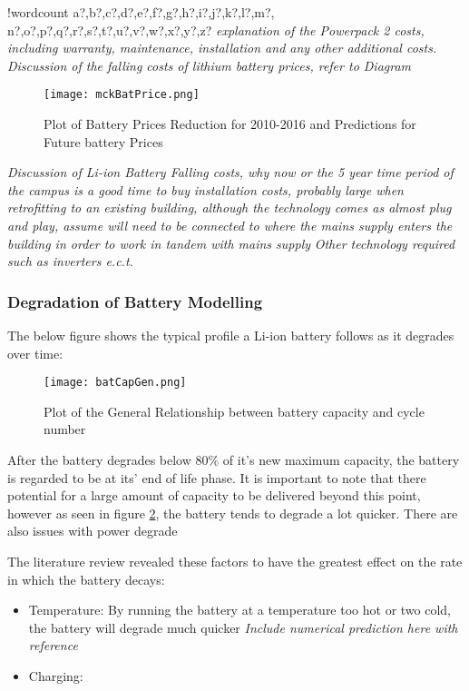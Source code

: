 \documentclass[fontsize=9.5pt]{extarticle}
\providecommand{\tightlist}{%
  \setlength{\itemsep}{0pt}\setlength{\parskip}{0pt}}
\newcounter{words}
\newenvironment{counted}{%
  \setcounter{words}{0}
  \SearchList!{wordcount}{\stepcounter{words}}
    {a?,b?,c?,d?,e?,f?,g?,h?,i?,j?,k?,l?,m?,
    n?,o?,p?,q?,r?,s?,t?,u?,v?,w?,x?,y?,z?}
  \UndoBoundary{'}
  \SearchOrder{p;}}{%
  \StopSearching}
\begin{document}
\begin{counted}
\emph{explanation of the Powerpack 2 costs, including warranty,
maintenance, installation and any other additional costs. Discussion of
the falling costs of lithium battery prices, refer to Diagram}

\begin{figure}[H]
  \centering
  \texttt{[image: mckBatPrice.png]}
  \caption{Plot of Battery Prices Reduction for 2010-2016 and Predictions for Future battery Prices \cite{mckBat}}
  \label{mckBatPrice}
\end{figure}

\emph{Discussion of Li-ion Battery Falling costs, why now or the 5 year
time period of the campus is a good time to buy} \emph{installation
costs, probably large when retrofitting to an existing building,
although the technology comes as almost plug and play, assume will need
to be connected to where the mains supply enters the building in order
to work in tandem with mains supply} \emph{Other technology required
such as inverters e.c.t.}

\subsubsection{Degradation of Battery
Modelling}\label{degradation-of-battery-modelling}

The below figure shows the typical profile a Li-ion battery follows as
it degrades over time:

\begin{figure}[H]
  \centering
  \texttt{[image: batCapGen.png]}
  \caption{Plot of the General Relationship between battery capacity and cycle number \cite{spotnitz2003simulation} }
  \label{batCapGen}
\end{figure}

After the battery degrades below 80\% of it's new maximum capacity, the
battery is regarded to be at its' end of life phase. It is important to
note that there potential for a large amount of capacity to be delivered
beyond this point, however as seen in figure \ref{batCapGen}, the
battery tends to degrade a lot quicker. There are also issues with power
degrade

The literature review revealed these factors to have the greatest effect
on the rate in which the battery decays:

\begin{itemize}
\tightlist
\item
  Temperature: By running the battery at a temperature too hot or two
  cold, the battery will degrade much quicker \emph{Include numerical
  prediction here with reference \cite{rong2006analytical}}
\item
  Charging:


\end{itemize}
\end{counted}
\end{document}

